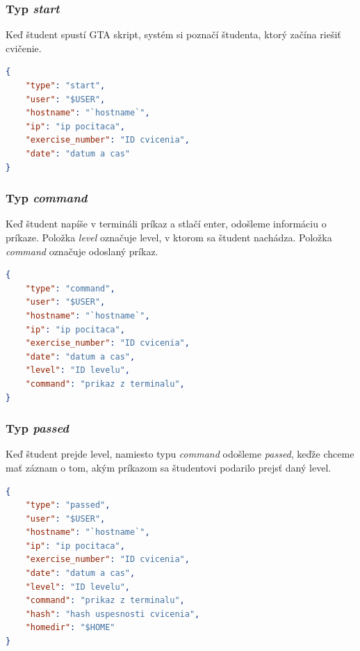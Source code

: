 \subsubsection{Typ \textit{start}}
\label{sec:zbieraniedat:start}

Keď študent spustí GTA skript, systém si poznačí študenta, ktorý začína riešiť cvičenie.

\begin{lstlisting}[language=json,firstnumber=1]
{
    "type": "start",
    "user": "$USER",
    "hostname": "`hostname`",
    "ip": "ip pocitaca",
    "exercise_number": "ID cvicenia",
    "date": "datum a cas"
}
\end{lstlisting}

\subsubsection{Typ \textit{command}}
\label{sec:zbieraniedat:gtadata:command}

Keď študent napíše v termináli príkaz a stlačí enter, odošleme informáciu o príkaze.
Položka \textit{level} označuje level, v ktorom sa študent nachádza. Položka
\textit{command} označuje odoslaný príkaz.

\begin{lstlisting}[language=json,firstnumber=1]
{
    "type": "command",
    "user": "$USER",
    "hostname": "`hostname`",
    "ip": "ip pocitaca",
    "exercise_number": "ID cvicenia",
    "date": "datum a cas",
    "level": "ID levelu",
    "command": "prikaz z terminalu",
}
\end{lstlisting}

\subsubsection{Typ \textit{passed}}
\label{sec:zbieraniedat:gtadata:passed}

Keď študent prejde level, namiesto typu \textit{command} odošleme \textit{passed},
keďže chceme mať záznam o tom, akým príkazom sa študentovi podarilo prejsť daný level.

\begin{lstlisting}[language=json,firstnumber=1]
{
    "type": "passed",
    "user": "$USER",
    "hostname": "`hostname`",
    "ip": "ip pocitaca",
    "exercise_number": "ID cvicenia",
    "date": "datum a cas",
    "level": "ID levelu",
    "command": "prikaz z terminalu",
    "hash": "hash uspesnosti cvicenia",
    "homedir": "$HOME"
}
\end{lstlisting}

